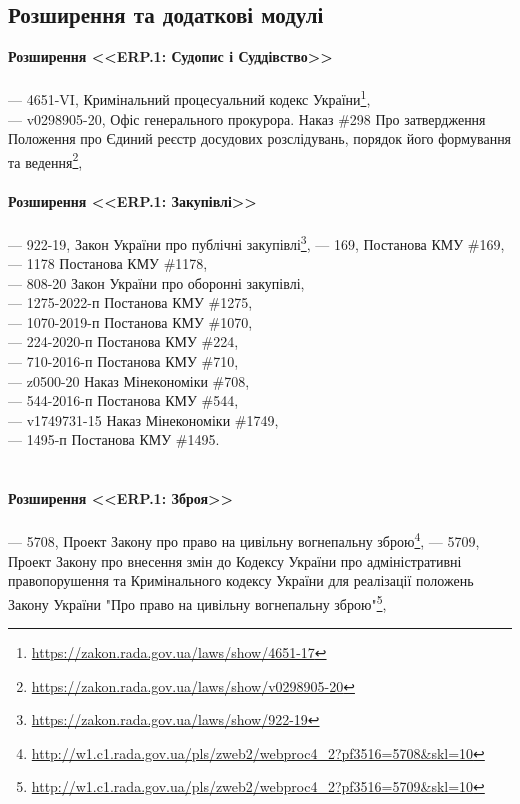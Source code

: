 \newpage
\subsection{Розширення та додаткові модулі}

{\bf Розширення <<ERP.1: Судопис і Суддівство>>}
\\
\\
--- {4651-VI}, Кримінальний процесуальний кодекс України\footnote{\url{https://zakon.rada.gov.ua/laws/show/4651-17}},\\
--- {v0298905-20}, Офіс генерального прокурора. Наказ \#298 Про затвердження Положення про Єдиний реєстр досудових розслідувань, порядок його формування та ведення\footnote{\url{https://zakon.rada.gov.ua/laws/show/v0298905-20}},
\\
\\
{\bf Розширення <<ERP.1: Закупівлі>>}
\\
\\
--- {922-19}, Закон України про публічні закупівлі\footnote{\url{https://zakon.rada.gov.ua/laws/show/922-19}},
--- {169}, Постанова КМУ \#169, \\
--- {1178} Постанова КМУ \#1178, \\
--- {808-20} Закон України про оборонні закупівлі, \\
--- {1275-2022-п} Постанова КМУ \#1275, \\
--- {1070-2019-п} Постанова КМУ \#1070, \\
--- {224-2020-п} Постанова КМУ \#224, \\
--- {710-2016-п} Постанова КМУ \#710, \\
--- {z0500-20} Наказ Мінекономіки \#708, \\
--- {544-2016-п} Постанова КМУ \#544, \\
--- {v1749731-15} Наказ Мінекономіки \#1749, \\
--- {1495-п} Постанова КМУ \#1495. \\
\\
\\
{\bf Розширення <<ERP.1: Зброя>>}
\\
\\
--- {5708}, Проект Закону про право на цивільну вогнепальну зброю\footnote{\url{http://w1.c1.rada.gov.ua/pls/zweb2/webproc4_2?pf3516=5708&skl=10}},
--- {5709}, Проект Закону про внесення змін до Кодексу України про адміністративні правопорушення та Кримінального кодексу України для реалізації положень Закону України "Про право на цивільну вогнепальну зброю"\footnote{\url{http://w1.c1.rada.gov.ua/pls/zweb2/webproc4_2?pf3516=5709&skl=10}},
